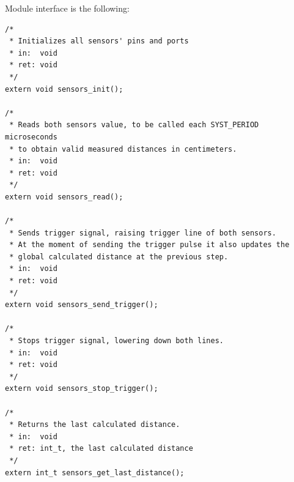 Module interface is the following:


\begin{verbatim}
/* 
 * Initializes all sensors' pins and ports
 * in:  void
 * ret: void
 */
extern void sensors_init();

/*
 * Reads both sensors value, to be called each SYST_PERIOD microseconds
 * to obtain valid measured distances in centimeters.
 * in:  void
 * ret: void
 */
extern void sensors_read();

/*
 * Sends trigger signal, raising trigger line of both sensors.
 * At the moment of sending the trigger pulse it also updates the
 * global calculated distance at the previous step.
 * in:  void
 * ret: void
 */
extern void sensors_send_trigger();

/*
 * Stops trigger signal, lowering down both lines.
 * in:  void
 * ret: void
 */
extern void sensors_stop_trigger();

/*
 * Returns the last calculated distance.
 * in:  void
 * ret: int_t, the last calculated distance
 */
extern int_t sensors_get_last_distance();
\end{verbatim}



